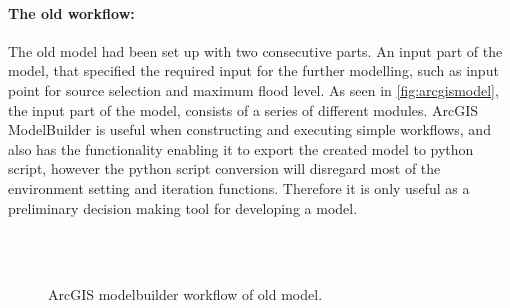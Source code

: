 \paragraph{The old workflow:} The old model had been set up with two consecutive parts. An input part of the model, that specified the required input for the further modelling, such as input point for source selection and maximum flood level. As seen in \autoref{fig:arcgismodel}, the input part of the model, consists of a series of different modules.  ArcGIS ModelBuilder is useful when constructing and executing simple workflows, and also has the functionality enabling it to export the created model to python script, however the python script conversion will disregard most of the environment setting and iteration functions. Therefore it is only useful as a preliminary decision making tool for developing a model.

\begin{figure}[h!]
  \myfloatalign
   \\ \quad
   \\
  \caption{ArcGIS modelbuilder workflow of old model.}
  \label{fig:arcgismodel}
\end{figure}

